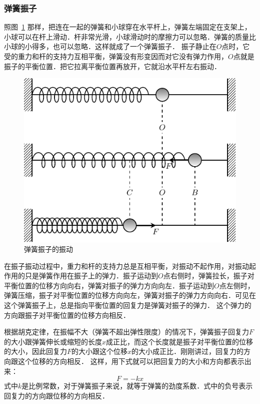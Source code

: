 \subsubsection{弹簧振子} 

照图~\ref{fig_A_9-2} 那样，把连在一起的弹簧和小球穿在水平杆上，弹簧左端固定在支架上，小球可以在杆上滑动．杆非常光滑，小球滑动时的摩擦力可以忽略．弹簧的质量比小球的小得多，也可以忽略．这样就成了一个弹簧振子．
振子静止在$O$点时，它受的重力和杆的支持力互相平衡，弹簧没有形变因而对它没有弹力作用，$O$点就是振子的平衡位置．把它拉离平衡位置再放开，它就沿水平杆左右振动．


\begin{figure}[htbp]
	\centering
	\includegraphics{fig/A/9-2.pdf}
	\caption{弹簧振子的振动}\label{fig_A_9-2}
\end{figure}


在振子振动过程中，重力和杆的支持力总是互相平衡，对振动不起作用，对振动起作用的只是弹簧作用在振子上的弹力．振子运动到$O$点右侧时，弹簧拉长，振子对平衡位置的位移方向向右，弹簧对振子的弹力方向向左．振子运动到$O$点左侧时，弹簧压缩，振子对平衡位置的位移方向向左，弹簧对振子的弹力方向向右．可见在这个弹簧振子上，总是指向平衡位置的回复力是弹簧对振子的弹力．
这个弹力的方向跟振子对平衡位置的位移方向相反．

根据胡克定律，在振幅不大（弹簧不超出弹性限度）的情况下，弹簧振子回复力$F$的大小跟弹簧伸长或缩短的长度$x$成正比，而这个长度就是振子对平衡位置的位移的大小，因此回复力$F$的大小跟这个位移$x$的大小成正比．刚刚讲过，回复力的方向跟这个位移的方向相反．
这样，用下式就可以把回复力的大小和方向都表示出来：
\[F=-kx\]
式中$k$是比例常数，对于弹簧振子来说，就等于弹簧的劲度系数．式中的负号表示回复力的方向跟位移的方向相反．

